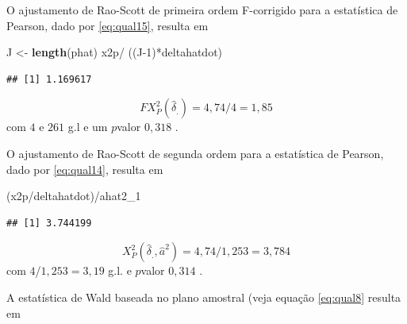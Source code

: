 \documentclass[]{book}
\newenvironment{Shaded}{\begin{snugshade}}{\end{snugshade}}
\newcommand{\KeywordTok}[1]{\textcolor[rgb]{0.13,0.29,0.53}{\textbf{{#1}}}}
\newcommand{\DataTypeTok}[1]{\textcolor[rgb]{0.13,0.29,0.53}{{#1}}}
\newcommand{\DecValTok}[1]{\textcolor[rgb]{0.00,0.00,0.81}{{#1}}}
\newcommand{\StringTok}[1]{\textcolor[rgb]{0.31,0.60,0.02}{{#1}}}
\newcommand{\NormalTok}[1]{{#1}}
\numberwithin{example}{chapter}
\numberwithin{remark}{chapter}
\numberwithin{definition}{chapter}
\begin{document}
O ajustamento de Rao-Scott de primeira ordem F-corrigido para a
estatística de Pearson, dado por \eqref{eq:qual15}, resulta em

\begin{Shaded}
\begin{Highlighting}[]
\NormalTok{J <-}\StringTok{ }\KeywordTok{length}\NormalTok{(phat)}
\NormalTok{x2p/}\StringTok{ }\NormalTok{((J}\DecValTok{-1}\NormalTok{)*deltahatdot)}
\end{Highlighting}
\end{Shaded}

\begin{verbatim}
## [1] 1.169617
\end{verbatim}

\[
FX_{P}^{2}\left( \hat{\delta}_{.}\right) =4,74/4=1,85
\] com \(4\) e \(261\) g.l e um \(p\)valor \(0,318\) .

O ajustamento de Rao-Scott de segunda ordem para a estatística de
Pearson, dado por \eqref{eq:qual14}, resulta em

\begin{Shaded}
\begin{Highlighting}[]
\NormalTok{(x2p/deltahatdot)/ahat2_1}
\end{Highlighting}
\end{Shaded}

\begin{verbatim}
## [1] 3.744199
\end{verbatim}

\[
X_{P}^{2}\left( \hat{\delta}_{.},\hat{a}^{2}\right) =4,74/1,253=3,784 
\] com \(4\)/\(1,253=3,19\) g.l. e \(p\)valor \(0,314\) .

A estatística de Wald baseada no plano amostral (veja equação
\eqref{eq:qual8} resulta em

\begin{Shaded}
\end{Shaded}
\end{document}
